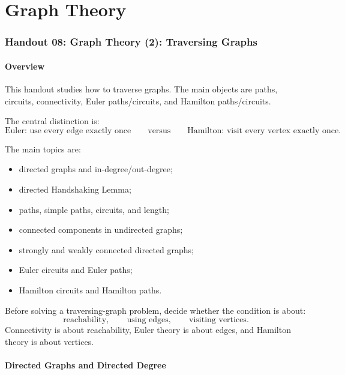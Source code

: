 \part{Graph Theory}
\section{Handout 08: Graph Theory (2): Traversing Graphs}

\subsection{Overview}

This handout studies how to traverse graphs. The main objects are paths, circuits, connectivity, Euler paths/circuits, and Hamilton paths/circuits.

The central distinction is:
\[
\text{Euler: use every edge exactly once}
\qquad\text{versus}\qquad
\text{Hamilton: visit every vertex exactly once}.
\]

The main topics are:
\begin{itemize}[leftmargin=*]
    \item directed graphs and in-degree/out-degree;
    \item directed Handshaking Lemma;
    \item paths, simple paths, circuits, and length;
    \item connected components in undirected graphs;
    \item strongly and weakly connected directed graphs;
    \item Euler circuits and Euler paths;
    \item Hamilton circuits and Hamilton paths.
\end{itemize}

\begin{examtip}[title={Main diagnostic for Handout 08}]
Before solving a traversing-graph problem, decide whether the condition is about:
\[
\text{reachability},\qquad
\text{using edges},\qquad
\text{visiting vertices}.
\]
Connectivity is about reachability, Euler theory is about edges, and Hamilton theory is about vertices.
\end{examtip}

\subsection{Directed Graphs and Directed Degree}

